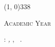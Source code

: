 \begin{titlepage}
\begin{center}
        \vspace{40pt}

        \line(1, 0){338} \\
        \begin{normalsize}
            \textsc{Academic Year \myAA}
        \end{normalsize}
    \end{center}

    \vfill

    \noindent\OurName: \textit{\myTitle,}
    \myDegree,
    \textcopyright\ \myTime.
\end{titlepage}